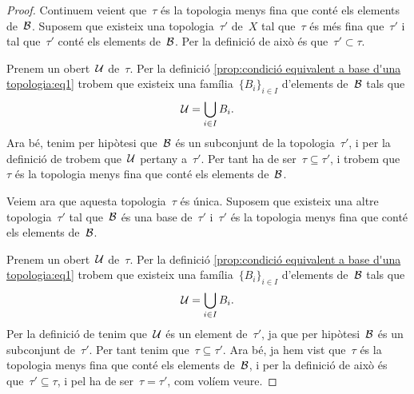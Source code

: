\documentclass[../../main.tex]{subfiles}
\begin{document}
\begin{proposition}
\begin{proof}
			Continuem veient que~\(\tau\) és la topologia menys fina que conté els elements de~\(\mathcal{B}\).
			Suposem que existeix una topologia~\(\tau'\) de~\(X\) tal que~\(\tau\) és més fina que~\(\tau'\) i tal que~\(\tau'\) conté els elements de~\(\mathcal{B}\).
			Per la definició de  això és que~\(\tau'\subset\tau\).

			Prenem un obert~\(\mathcal{U}\) de~\(\tau\).
			Per la definició \eqref{prop:condició equivalent a base d'una topologia:eq1} trobem que existeix una família~\(\{B_{i}\}_{i\in I}\) d'elements de~\(\mathcal{B}\) tals que
			\[
			    \mathcal{U}=\bigcup_{i\in I}B_{i}.
			\]
			Ara bé, tenim per hipòtesi que~\(\mathcal{B}\) és un subconjunt de la topologia~\(\tau'\), i per la definició de  trobem que~\(\mathcal{U}\) pertany a~\(\tau'\).
			Per tant ha de ser~\(\tau\subseteq\tau'\), i trobem que~\(\tau\) és la topologia menys fina que conté els elements de~\(\mathcal{B}\).

			Veiem ara que aquesta topologia~\(\tau\) és única.
			Suposem que existeix una altre topologia~\(\tau'\) tal que~\(\mathcal{B}\) és una base de~\(\tau'\) i~\(\tau'\) és la topologia menys fina que conté els elements de~\(\mathcal{B}\).

			Prenem un obert~\(\mathcal{U}\) de~\(\tau\).
			Per la definició \eqref{prop:condició equivalent a base d'una topologia:eq1} trobem que existeix una família~\(\{B_{i}\}_{i\in I}\) d'elements de~\(\mathcal{B}\) tals que
			\[
			    \mathcal{U}=\bigcup_{i\in I}B_{i}.
			\]
			Per la definició de  tenim que~\(\mathcal{U}\) és un element de~\(\tau'\), ja que per hipòtesi~\(\mathcal{B}\) és un subconjunt de~\(\tau'\).
			Per tant tenim que~\(\tau\subseteq\tau'\).
			Ara bé, ja hem vist que~\(\tau\) és la topologia menys fina que conté els elements de~\(\mathcal{B}\), i per la definició de  això és que~\(\tau'\subseteq\tau\), i pel  ha de ser~\(\tau=\tau'\), com volíem veure.
		\end{proof}
	\end{proposition}
\end{document}
